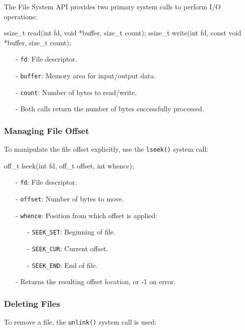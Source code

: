 \documentclass[../../compsys.tex]{subfiles}
\begin{document}
The File System API provides two primary system calls to perform I/O operations:

\begin{cc}
ssize_t read(int fd, void *buffer, size_t count);
ssize_t write(int fd, const void *buffer, size_t count);
\end{cc}
\begin{itemize}[itemsep=2pt, topsep=1pt]
  \item[-] \texttt{fd}: File descriptor.
  \item[-] \texttt{buffer}: Memory area for input/output data.
  \item[-] \texttt{count}: Number of bytes to read/write.
  \item[-] Both calls return the number of bytes successfully processed.
\end{itemize}
\newpage
\subsubsection{Managing File Offset}

To manipulate the file offset explicitly, use the \texttt{lseek()} system call:

\begin{cc}
off_t lseek(int fd, off_t offset, int whence);
\end{cc}
\begin{itemize}[itemsep=2pt, topsep=1pt]
  \item[-] \texttt{fd}: File descriptor.
  \item[-] \texttt{offset}: Number of bytes to move.
  \item[-] \texttt{whence}: Position from which offset is applied:
    \begin{itemize}[itemsep=2pt, topsep=1pt]
      \item[-]\texttt{SEEK\_SET}: Beginning of file.
      \item[-] \texttt{SEEK\_CUR}: Current offset.
      \item[-] \texttt{SEEK\_END}: End of file.
    \end{itemize}
  \item[-] Returns the resulting offset location, or -1 on error.
\end{itemize}

\subsubsection{Deleting Files}

To remove a file, the \texttt{unlink()} system call is used:
\end{document}

